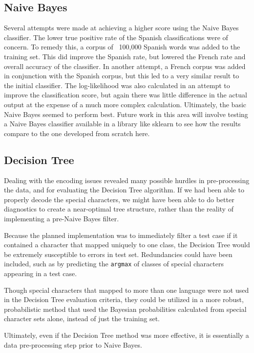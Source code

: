 \documentclass[conference]{IEEEtran}
\begin{document}
\subsection{Naive Bayes}
Several attempts were made at achieving a higher score using the Naive Bayes classifier. The lower true positive rate of the Spanish classifications were of concern. To remedy this, a corpus of ~100,000 Spanish words was added to the training set. This did improve the Spanish rate, but lowered the French rate and overall accuracy of the classifier. In another attempt, a French corpus was added in conjunction with the Spanish corpus, but this led to a very similar result to the initial classifier.
The log-likelihood was also calculated in an attempt to improve the classification score, but again there was little difference in the actual output at the expense of a much more complex calculation. Ultimately, the basic Naive Bayes seemed to perform best. Future work in this area will involve testing a Naive Bayes classifier available in a library like sklearn to see how the results compare to the one developed from scratch here. 

\subsection{Decision Tree}
Dealing with the encoding issues revealed many possible hurdles in pre-processing the data, and for evaluating the Decision Tree algorithm. If we had been able to properly decode the special characters, we might have been able to do better diagnostics to create a near-optimal tree structure, rather than the reality of implementing a pre-Naive Bayes filter.

Because the planned implementation was to immediately filter a test case if it contained a character that mapped uniquely to one class, the Decision Tree would be extremely susceptible to errors in test set. Redundancies could have been included, such as by predicting the \texttt{argmax} of classes of special characters appearing in a test case.

Though special characters that mapped to more than one language were not used in the Decision Tree evaluation criteria, they could be utilized in a more robust, probabilistic method that used the  Bayesian probabilities calculated from special character sets alone, instead of just the training set.

Ultimately, even if the Decision Tree method was more effective, it is essentially a data pre-processing step prior to Naive Bayes. 
\end{document}
